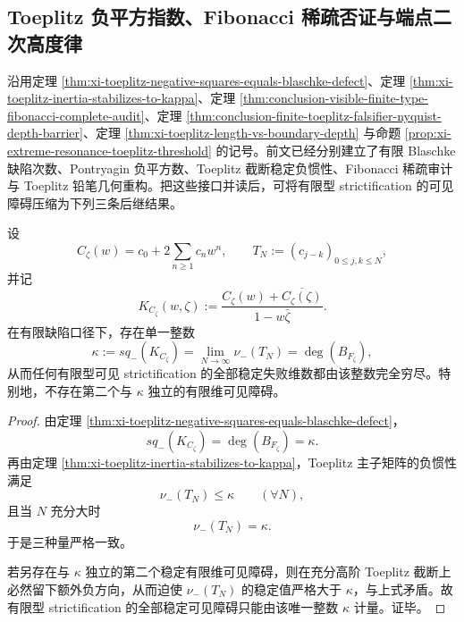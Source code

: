 \subsection{Toeplitz 负平方指数、Fibonacci 稀疏否证与端点二次高度律}\label{subsec:conclusion-toeplitz-negativeindex-fibonacci-localization-height-law}
沿用定理 \ref{thm:xi-toeplitz-negative-squares-equals-blaschke-defect}、定理 \ref{thm:xi-toeplitz-inertia-stabilizes-to-kappa}、定理 \ref{thm:conclusion-visible-finite-type-fibonacci-complete-audit}、定理 \ref{thm:conclusion-finite-toeplitz-falsifier-nyquist-depth-barrier}、定理 \ref{thm:xi-toeplitz-length-vs-boundary-depth} 与命题 \ref{prop:xi-extreme-resonance-toeplitz-threshold} 的记号。前文已经分别建立了有限 Blaschke 缺陷次数、Pontryagin 负平方数、Toeplitz 截断稳定负惯性、Fibonacci 稀疏审计与 Toeplitz 铅笔几何重构。把这些接口并读后，可将有限型 strictification 的可见障碍压缩为下列三条后继结果。

\begin{theorem}\label{thm:conclusion-visible-strictification-finite-obstruction-rank}
设
\[
C_\zeta(w)=c_0+2\sum_{n\ge 1}c_n w^n,
\qquad
T_N:=(c_{j-k})_{0\le j,k\le N},
\]
并记
\[
K_{C_\zeta}(w,\zeta):=
\frac{C_\zeta(w)+\overline{C_\zeta(\zeta)}}{1-w\bar\zeta}.
\]
在有限缺陷口径下，存在单一整数
\[
\kappa
:=
sq_-(K_{C_\zeta})
=
\lim_{N\to\infty}\nu_-(T_N)
=
\deg(B_{F_\zeta}),
\]
从而任何有限型可见 strictification 的全部稳定失败维数都由该整数完全穷尽。特别地，不存在第二个与 \(\kappa\) 独立的有限维可见障碍。
\end{theorem}
\begin{proof}
由定理 \ref{thm:xi-toeplitz-negative-squares-equals-blaschke-defect}，
\[
sq_-(K_{C_\zeta})=\deg(B_{F_\zeta})=\kappa.
\]
再由定理 \ref{thm:xi-toeplitz-inertia-stabilizes-to-kappa}，Toeplitz 主子矩阵的负惯性满足
\[
\nu_-(T_N)\le \kappa
\qquad(\forall N),
\]
且当 \(N\) 充分大时
\[
\nu_-(T_N)=\kappa.
\]
于是三种量严格一致。

若另存在与 \(\kappa\) 独立的第二个稳定有限维可见障碍，则在充分高阶 Toeplitz 截断上必然留下额外负方向，从而迫使 \(\nu_-(T_N)\) 的稳定值严格大于 \(\kappa\)，与上式矛盾。故有限型 strictification 的全部稳定可见障碍只能由该唯一整数 \(\kappa\) 计量。证毕。
\end{proof}

